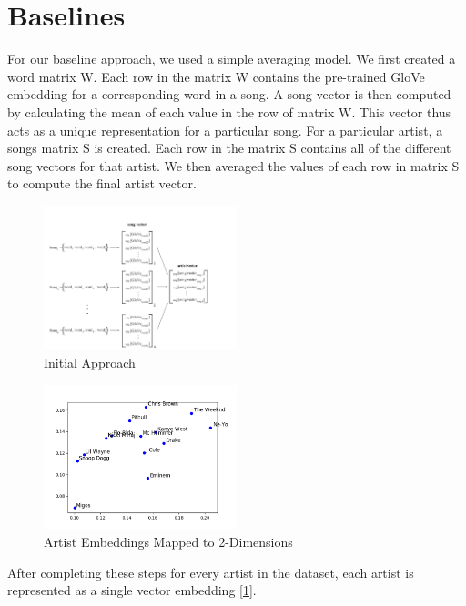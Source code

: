 \documentclass[11pt,a4paper]{article}
\begin{document}
    \section{Baselines}
For our baseline approach, we used a simple averaging model. We first created a word matrix W. Each row in the matrix W contains the pre-trained GloVe embedding  for a corresponding word in a song. 
A song vector is then computed by calculating the mean of each value in the row of matrix W. 
This vector thus acts as a unique representation for a particular song. 
For a particular artist, a songs matrix S is created. Each row in the matrix S contains all of the different song vectors for that artist. 
We then averaged the values of each row in matrix S to compute the final artist vector. 

\begin{figure}[t]
    \centering
    \includegraphics[width=0.5\textwidth]{figs/naive_model.png}
    \caption{Initial Approach}
    \label{fig:naive}
\end{figure}
\begin{figure}[ht]
    \centering
    \includegraphics[width=0.5\textwidth]{figs/artist_dist.png}
    \caption{Artist Embeddings Mapped to 2-Dimensions}
    \label{fig:artist}
\end{figure}


After completing these steps for every artist in the dataset, each artist is represented as a single vector embedding [\ref{fig:naive}].
\end{document}
